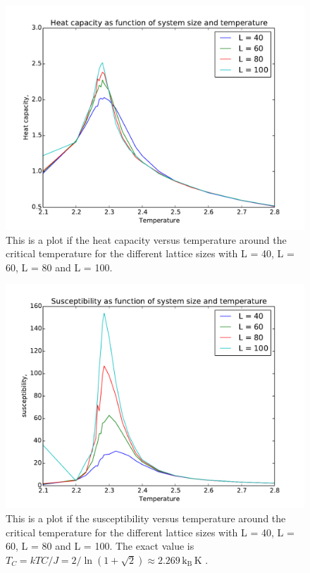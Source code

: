 \begin{figure}[H]
\includegraphics[width=\linewidth]{../results/4e/4e_Cv}\caption{This is a plot if the heat capacity versus temperature around the critical temperature for the different lattice sizes with L = 40, L = 60, L = 80 and L = 100.}\label{fig:4e_heat_capa}
\end{figure}

\begin{figure}[H]
\includegraphics[width=\linewidth]{../results/4e/4e_x}\caption{This is a plot if the susceptibility versus temperature around the critical temperature for the different lattice sizes with L = 40, L = 60, L = 80 and L = 100. The exact value is $T_C =  kTC/J = 2/ \ln(1+\sqrt{
2}) \approx 2.269 \,\text{k}_\text{B} \,\text{K}$ \cite{Onsager}.}\label{fig:4e_suscept}
\end{figure}

